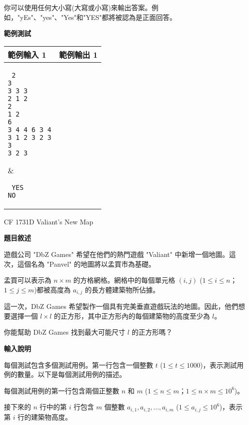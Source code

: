     你可以使用任何大小寫(大寫或小寫)來輸出答案。例如，"yEs"、"yes"、"Yes"和"YES"都將被認為是正面回答。

    \textbf{範例測試}

    \begin{tabular}{|m{7cm}|m{7cm}|}
        \hline
        範例輸入 1 & 範例輸出 1 \\
        \hline
        \parbox[t]{7cm} %
        { \tt
        2 \\
        3 \\
        3 3 3 \\
        2 1 2 \\
        2 \\
        1 2 \\
        6 \\
        3 4 4 6 3 4 \\
        3 1 2 3 2 3 \\
        3 \\
        3 2 3 \\
        } &
        \parbox[t]{7cm}
        { \tt
        YES \\
        NO \\
        } \\
        \hline
    \end{tabular}

    \problem CF 1731D Valiant's New Map

    \textbf{題目敘述}

    遊戲公司 "DbZ Games" 希望在他們的熱門遊戲 "Valiant" 中新增一個地圖。這次，這個名為 "Panvel" 的地圖將以孟買市為基礎。

    孟買可以表示為 $n\times m$ 的方格網格。網格中的每個單元格 $(i,j)$ ($1\leq i\leq n$；$1\leq j\leq m$)都被高度為 $a_{i,j}$ 的長方體建築物所佔據。
    
    這一次，DbZ Games 希望製作一個具有完美垂直遊戲玩法的地圖。因此，他們想要選擇一個 $l\times l$ 的正方形，其中正方形內的每個建築物的高度至少為 $l$。
    
    你能幫助 DbZ Games 找到最大可能尺寸 $l$ 的正方形嗎？

    \textbf{輸入說明}

    每個測試包含多個測試用例。第一行包含一個整數 $t$ ($1\leq t\leq 1000$)，表示測試用例的數量。以下是每個測試用例的描述。

    每個測試用例的第一行包含兩個正整數 $n$ 和 $m$ ($1\leq n\leq m$；$1\leq n\times m\leq 10^6$)。
    
    接下來的 $n$ 行中的第 $i$ 行包含 $m$ 個整數 $a_{i,1}, a_{i,2}, \ldots, a_{i,m}$ ($1\leq a_{i,j}\leq 10^6$)，表示第 $i$ 行的建築物高度。
    
